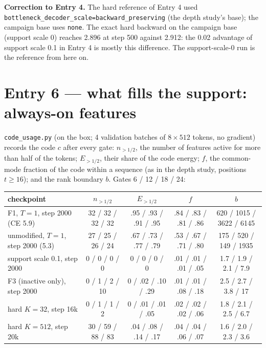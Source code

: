 \documentclass[11pt,a4paper]{article}
\newcommand{\code}[1]{\texttt{#1}}
\begin{document}
\textbf{Correction to Entry 4.}  The hard reference of Entry 4 used \code{bottleneck\_decoder\_scale=backward\_preserving}
(the depth study's base); the campaign base uses \code{none}.  The exact hard backward on the campaign base
(support scale 0) reaches 2.896 at step 500 against 2.912: the 0.02 advantage of support scale 0.1 in Entry 4 is
mostly this difference.  The support-scale-0 run is the reference from here on.

\section{Entry 6 --- what fills the support: always-on features}

\code{code\_usage.py} (on the box; 4 validation batches of \(8\times512\) tokens, no gradient) records the code
\(c\) after every gate: \(n_{>1/2}\), the number of features active for more than half of the tokens; \(E_{>1/2}\),
their share of the code energy; \(f\), the common-mode fraction of the code within a sequence (as in the depth
study, positions \(t\ge16\)); and the rank boundary \(b\).  Gates 6 / 12 / 18 / 24:

\begin{center}\small
\begin{tabular}{lcccc}
\toprule
checkpoint & \(n_{>1/2}\) & \(E_{>1/2}\) & \(f\) & \(b\) \\
\midrule
F1, \(T=1\), step 2000 (CE 5.9)        & 32 / 32 / 32 / 32 & .95 / .93 / .91 / .95 & .84 / .83 / .81 / .86 & 620 / 1015 / 3622 / 6145 \\
unmodified, \(T=1\), step 2000 (5.3)   & 27 / 25 / 26 / 24 & .67 / .73 / .77 / .79 & .53 / .67 / .71 / .80 & 175 / 520 / 149 / 1935 \\
support scale 0.1, step 2000           & 0 / 0 / 0 / 0     & 0 / 0 / 0 / 0         & .01 / .01 / .01 / .05 & 1.7 / 1.9 / 2.1 / 7.9 \\
F3 (inactive only), step 2000          & 0 / 1 / 2 / 10    & 0 / .02 / .10 / .29   & .01 / .01 / .08 / .18 & 2.5 / 2.7 / 3.8 / 17 \\
hard \(K=32\), step 16k                & 0 / 1 / 1 / 2     & 0 / .01 / .01 / .05   & .02 / .02 / .02 / .06 & 1.8 / 2.1 / 2.5 / 6.7 \\
hard \(K=512\), step 20k               & 30 / 59 / 88 / 83 & .04 / .08 / .14 / .17 & .04 / .04 / .06 / .07 & 1.6 / 2.0 / 2.3 / 3.6 \\
\bottomrule
\end{tabular}
\end{center}
\end{document}
